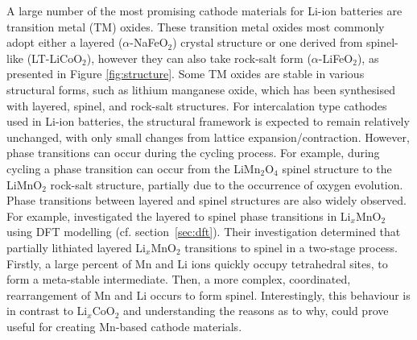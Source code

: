 \documentclass[../main.tex]{subfiles}
\begin{document}
A large number of the most promising cathode materials for Li-ion batteries are transition metal (TM) oxides. These transition metal oxides most commonly adopt either a layered ($\alpha$-NaFeO$_2$) crystal structure or one derived from spinel-like (LT-LiCoO$_2$), however they can also take rock-salt form ($\alpha$-LiFeO$_2$), as presented in Figure \ref{fig:structure}. Some TM oxides are stable in various structural forms, such as lithium manganese oxide, which has been synthesised with layered, \cite{armstrong1996synthesis} spinel, \cite{mosbah1983phases} and rock-salt structures. \cite{dittrich1969kristallstruktur} For intercalation type cathodes used in Li-ion batteries, the structural framework is expected to remain relatively unchanged, with only small changes from lattice expansion/contraction. However, phase transitions can occur during the cycling process. For example, during cycling a phase transition can occur from the LiMn$_2$O$_4$ spinel structure to the LiMnO$_2$ rock-salt structure, partially due to the occurrence of oxygen evolution. \cite{peng2017atomistic} Phase transitions between layered and spinel structures are also widely observed. \cite{chen2018understanding} For example, \citeauthor{reed2001layered} investigated the layered to spinel phase transitions in Li$_x$MnO$_2$ using DFT modelling (cf. section~\ref{sec:dft}). \cite{reed2001layered} Their investigation determined that partially lithiated layered Li$_x$MnO$_2$ transitions to spinel in a two-stage process. Firstly, a large percent of Mn and Li ions quickly occupy tetrahedral sites, to form a meta-stable intermediate. Then, a more complex, coordinated, rearrangement of Mn and Li occurs to form spinel. Interestingly, this behaviour is in contrast to Li$_x$CoO$_2$ and understanding the reasons as to why, could prove useful for creating Mn-based cathode materials.
\end{document}
